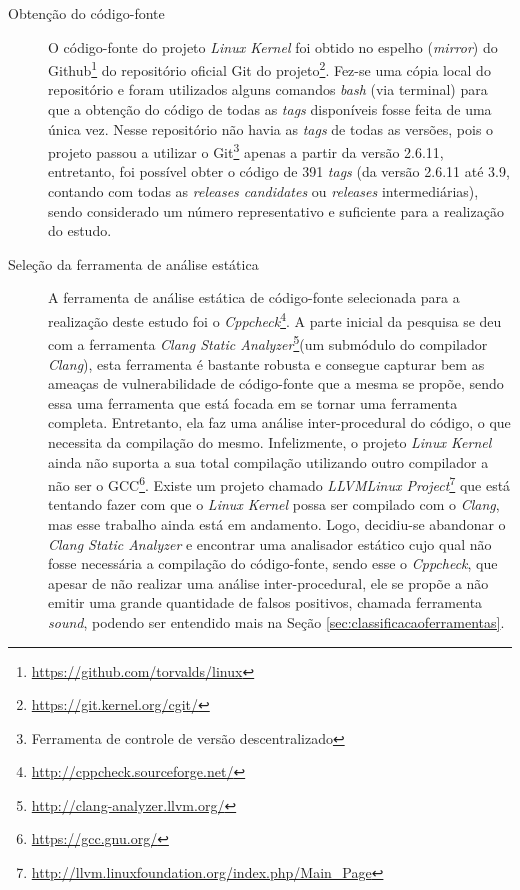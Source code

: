 \begin{description}

\item[Obtenção do código-fonte]

O código-fonte do projeto \textit{Linux Kernel} foi obtido no espelho
(\textit{mirror}) do Github\footnote{\url{https://github.com/torvalds/linux}}
do repositório oficial Git do
projeto\footnote{\url{https://git.kernel.org/cgit/}}.  Fez-se uma cópia local
do repositório e foram utilizados alguns comandos \textit{bash} (via terminal)
para que a obtenção do código de todas as \textit{tags} disponíveis fosse feita
de uma única vez. Nesse repositório não havia as \textit{tags} de todas as
versões, pois o projeto passou a utilizar o Git\footnote{Ferramenta de controle
de versão descentralizado} apenas a partir da versão 2.6.11, entretanto, foi
possível obter o código de 391 \textit{tags} (da versão 2.6.11 até 3.9, contando
com todas as \textit{releases candidates} ou \textit{releases} intermediárias),
sendo considerado um número representativo e suficiente para a realização do
estudo.

\item[Seleção da ferramenta de análise estática]

A ferramenta de análise estática de código-fonte selecionada para a realização
deste estudo foi o
\textit{Cppcheck}\footnote{\url{http://cppcheck.sourceforge.net/}}.  A parte
inicial da pesquisa se deu com a ferramenta \textit{Clang Static
Analyzer}\footnote{\url{http://clang-analyzer.llvm.org/}}(um submódulo do
compilador \textit{Clang}), esta ferramenta é bastante robusta e consegue capturar
bem as ameaças de vulnerabilidade de código-fonte que a mesma se propõe, sendo
essa uma ferramenta que está focada em se tornar uma ferramenta completa.
Entretanto, ela faz uma análise inter-procedural do código, o que necessita da
compilação do mesmo.  Infelizmente, o projeto \textit{Linux Kernel} ainda não
suporta a sua total compilação utilizando outro compilador a não ser o
GCC\footnote{\url{https://gcc.gnu.org/}}. Existe um projeto chamado
\textit{LLVMLinux
Project}\footnote{\url{http://llvm.linuxfoundation.org/index.php/Main_Page}} que
está tentando fazer com que o \textit{Linux Kernel} possa ser compilado com o
\textit{Clang}, mas esse trabalho ainda está em andamento. Logo, decidiu-se
abandonar o \textit{Clang Static Analyzer} e encontrar uma analisador estático
cujo qual não fosse necessária a compilação do código-fonte, sendo esse o
\textit{Cppcheck}, que apesar de não realizar uma análise inter-procedural, ele
se propõe a não emitir uma grande quantidade de falsos positivos, chamada
ferramenta \textit{sound}, podendo ser entendido mais na Seção
\ref{sec:classificacaoferramentas}.


\end{description}

